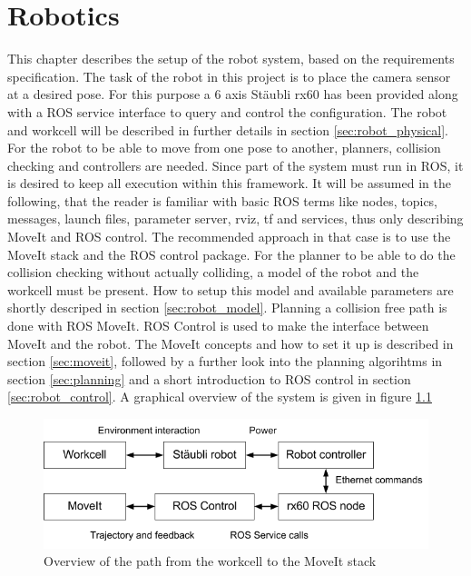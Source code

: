 \chapter{Robotics}
This chapter describes the setup of the robot system, based on the requirements specification. The task of the robot in this project is to place the camera sensor at a desired pose. For this purpose a 6 axis Stäubli rx60 has been provided along with a ROS service interface to query and control the configuration. The robot and workcell will be described in further details in section \ref{sec:robot_physical}. For the robot to be able to move from one pose to another, planners, collision checking and controllers are needed. Since part of the system must run in ROS, it is desired to keep all execution within this framework. It will be assumed in the following, that the reader is familiar with basic ROS terms like nodes, topics, messages, launch files, parameter server, rviz, tf and services, thus only describing MoveIt and ROS control. The recommended approach in that case is to use the MoveIt stack and the ROS control package.  For the planner to be able to do the collision checking without actually colliding, a model of the robot and the workcell must be present. How to setup this model and available parameters are shortly descriped in section \ref{sec:robot_model}. Planning a collision free path is done with ROS MoveIt. ROS Control is used to make the interface between MoveIt and the robot. The MoveIt concepts and how to set it up is described in section \ref{sec:moveit}, followed by a further look into the planning algorihtms in section \ref{sec:planning} and a short introduction to ROS control in section \ref{sec:robot_control}. A graphical overview of the system is given in figure \ref{fig:workcell_to_moveit_path}



\begin{figure}[htb]
	\begin{center}
		\includegraphics[scale=0.5,trim=0 0 0 0]{graphics/05_robotics/workcell_to_moveIt_path.png}%
		\caption{Overview of the path from the workcell to the MoveIt stack}
		\label{fig:workcell_to_moveit_path}
	\end{center}
\end{figure}


